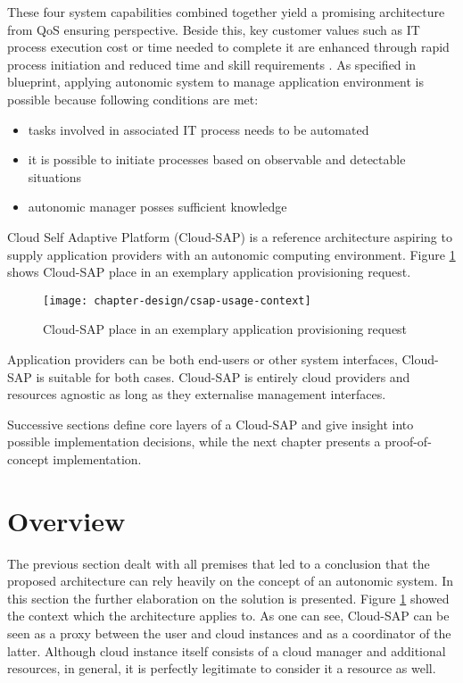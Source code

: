 These four system capabilities combined together yield a promising architecture from QoS ensuring perspective. Beside this, key customer values such as IT process execution cost or time needed to complete it are enhanced through rapid process initiation and reduced time and skill requirements \cite{IBM06}. As specified in blueprint, applying autonomic system to manage application environment is possible because following conditions are met:
\begin{itemize}
  \item tasks involved in associated IT process needs to be automated
  \item it is possible to initiate processes based on observable and detectable situations
  \item autonomic manager posses sufficient knowledge
\end{itemize}

Cloud Self Adaptive Platform (Cloud-SAP) is a reference architecture aspiring to supply application providers with an autonomic computing environment. Figure \ref{img:csap-usage-context} shows Cloud-SAP place in an exemplary application provisioning request. 
\begin{figure}[!ht]
  \begin{center}
    \texttt{[image: chapter-design/csap-usage-context]}
  \end{center}
  \caption{Cloud-SAP place in an exemplary application provisioning request}
  \label{img:csap-usage-context}
\end{figure}

Application providers can be both end-users or other system interfaces, Cloud-SAP is suitable for both cases. Cloud-SAP is entirely cloud providers and resources agnostic as long as they externalise management interfaces.

Successive sections define core layers of a Cloud-SAP and give insight into possible implementation decisions, while the next chapter presents a proof-of-concept implementation.

\section{Overview}
The previous section dealt with all premises that led to a conclusion that the proposed architecture can rely heavily on the concept of an autonomic system. In this section the further elaboration on the solution is presented.
Figure \ref{img:csap-usage-context} showed the context which the architecture applies to. As one can see, Cloud-SAP can be seen as a proxy between the user and cloud instances and as a coordinator of the latter. Although cloud instance itself consists of a cloud manager and additional resources, in general, it is perfectly legitimate to consider it a resource as well. 

